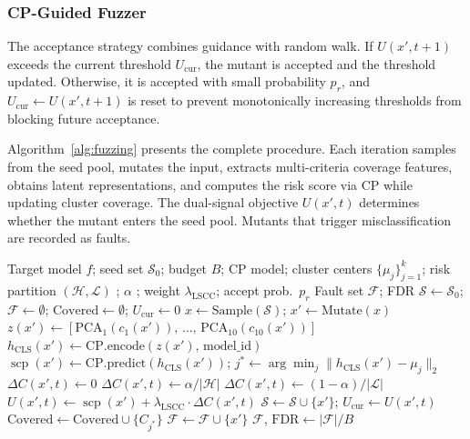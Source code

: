 \documentclass[preprint,number,5p,twocolumn]{elsarticle}
\DeclareMathOperator{\scp}{scp}
\begin{document}
\subsubsection{CP-Guided Fuzzer}

The acceptance strategy combines guidance with random walk. If $U(x', t{+}1)$ exceeds the current threshold $U_{\mathrm{cur}}$, the mutant is accepted and the threshold updated. Otherwise, it is accepted with small probability $p_r$, and $U_{\mathrm{cur}} \leftarrow U(x', t{+}1)$ is reset to prevent monotonically increasing thresholds from blocking future acceptance.

Algorithm~\ref{alg:fuzzing} presents the complete procedure. Each iteration samples from the seed pool, mutates the input, extracts multi-criteria coverage features, obtains latent representations, and computes the risk score via CP while updating cluster coverage. The dual-signal objective $U(x', t)$ determines whether the mutant enters the seed pool. Mutants that trigger misclassification are recorded as faults.

\begin{algorithm}[!t]
\small
\caption{CP-Guided Fuzzing}\label{alg:fuzzing}
\begin{algorithmic}[1]
\Require Target model $f$; seed set $\mathcal{S}_0$; budget $B$;
  CP model; cluster centers $\{\mu_j\}_{j=1}^{k}$;
  risk partition $(\mathcal{H}, \mathcal{L})$ ; $\alpha$ ; weight $\lambda_{\mathrm{LSCC}}$; accept prob.\ $p_r$
\Ensure Fault set $\mathcal{F}$; FDR
\State $\mathcal{S} \leftarrow \mathcal{S}_0$; $\mathcal{F} \leftarrow \emptyset$; $\mathrm{Covered} \leftarrow \emptyset$; $U_{\mathrm{cur}} \leftarrow 0$
  \State $x \leftarrow \mathrm{Sample}(\mathcal{S})$; $x' \leftarrow \mathrm{Mutate}(x)$
  \State $z(x') \leftarrow [\mathrm{PCA}_1(c_1(x')),\, \dots,\, \mathrm{PCA}_{10}(c_{10}(x'))]$ 
  \State $h_{\mathrm{CLS}}(x') \leftarrow \mathrm{CP}.\mathrm{encode}(z(x'),\, \mathrm{model\_id})$ 
  \State $\scp(x') \leftarrow \mathrm{CP}.\mathrm{predict}(h_{\mathrm{CLS}}(x'))$; $j^* \leftarrow \arg\min_j \|h_{\mathrm{CLS}}(x') - \mu_j\|_2$
  \State $\Delta C(x', t) \leftarrow 0$
   
     $\Delta C(x', t) \leftarrow \alpha / |\mathcal{H}|$
    \Else $\Delta C(x', t) \leftarrow (1{-}\alpha) / |\mathcal{L}|$
    \EndIf
  \EndIf
  \State $U(x', t) \leftarrow \scp(x') + \lambda_{\mathrm{LSCC}} \cdot \Delta C(x', t)$
    \State $\mathcal{S} \leftarrow \mathcal{S} \cup \{x'\}$; $U_{\mathrm{cur}} \leftarrow U(x', t)$
     $\mathrm{Covered} \leftarrow \mathrm{Covered} \cup \{C_{j^*}\}$ \EndIf {}
  \EndIf
   $\mathcal{F} \leftarrow \mathcal{F} \cup \{x'\}$ \EndIf
\EndFor
\State \Return $\mathcal{F}$, $\mathrm{FDR} \leftarrow |\mathcal{F}| / B$
\end{algorithmic}
\end{algorithm}
\end{document}
